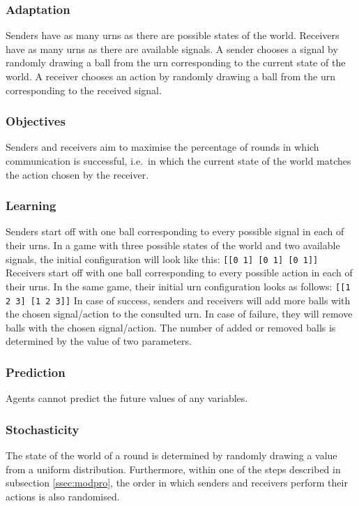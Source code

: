 \documentclass[DIV=calc,BCOR=0mm,pagesize]{scrartcl}
\newcommand{\code}[1]{\texttt{#1}}
\begin{document}
\subsubsection{Adaptation}
\label{sssec:moddesada}
Senders have as many urns as there are possible states of the world.
Receivers have as many urns as there are available signals.
A sender chooses a signal by randomly drawing a ball from the urn corresponding to the current state of the world.
A receiver chooses an action by randomly drawing a ball from the urn corresponding to the received signal.

\subsubsection{Objectives}
Senders and receivers aim to maximise the percentage of rounds in which communication is successful, i.e.~in which the current state of the world matches the action chosen by the receiver.

\subsubsection{Learning}
\label{sssec:moddeslea}
Senders start off with one ball corresponding to every possible signal in each of their urns.
In a game with three possible states of the world and two available signals, the initial configuration will look like this: \code{[[0 1] [0 1] [0 1]]}
Receivers start off with one ball corresponding to every possible action in each of their urns.
In the same game, their initial urn configuration looks as follows: \code{[[1 2 3] [1 2 3]]}
In case of success, senders and receivers will add more balls with the chosen signal/action to the consulted urn.
In case of failure, they will remove balls with the chosen signal/action.
The number of added or removed balls is determined by the value of two parameters.

\subsubsection{Prediction}
Agents cannot predict the future values of any variables.

\subsubsection{Stochasticity}
The state of the world of a round is determined by randomly drawing a value from a uniform distribution.
Furthermore, within one of the steps described in subsection \ref{ssec:modpro}, the order in which senders and receivers perform their actions is also randomised.
\end{document}
